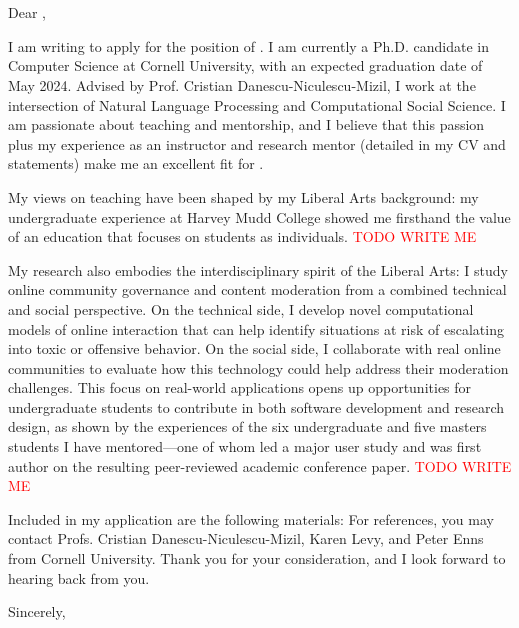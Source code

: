 \documentclass[12pt]{letter}
\begin{document}
\signature{Jonathan P. Chang}
\begin{letter}{
\department \\
\schoolnamelong \\
\schooladdress
}

\opening{
    Dear ,
}

I am writing to apply for the position of \position.
I am currently a Ph.D. candidate in Computer Science at Cornell University, with an expected graduation date of May 2024.
Advised by Prof. Cristian Danescu-Niculescu-Mizil, I work at the intersection of Natural Language Processing and Computational Social Science.
I am passionate about teaching and mentorship, and I believe that this passion plus my experience as an instructor and research mentor (detailed in my CV and statements) make me an excellent fit for \schoolname.

\ifliberalarts
My views on teaching have been shaped by my Liberal Arts background: my undergraduate experience at Harvey Mudd College showed me firsthand the value of an education that focuses on students as individuals.
\else
\textcolor{red}{TODO WRITE ME}
\fi
\coverteachingpara

\ifliberalarts
My research also embodies the interdisciplinary spirit of the Liberal Arts: I study online community governance and content moderation from a combined technical and social perspective.
On the technical side, I develop novel computational models of online interaction that can help identify situations at risk of escalating into toxic or offensive behavior.
On the social side, I collaborate with real online communities to evaluate how this technology could help address their moderation challenges.
This focus on real-world applications opens up opportunities for undergraduate students to contribute in both software development and research design, as shown by the experiences of the six undergraduate and five masters students I have mentored---one of whom led a major user study and was first author on the resulting peer-reviewed academic conference paper.
\coverresearchpara
\else
\textcolor{red}{TODO WRITE ME}
\fi

Included in my application are the following materials: \materials
For references, you may contact Profs. Cristian Danescu-Niculescu-Mizil, Karen Levy, and Peter Enns from Cornell University.
Thank you for your consideration, and I look forward to hearing back from you.

\closing{Sincerely,}

\end{letter}
\end{document}
